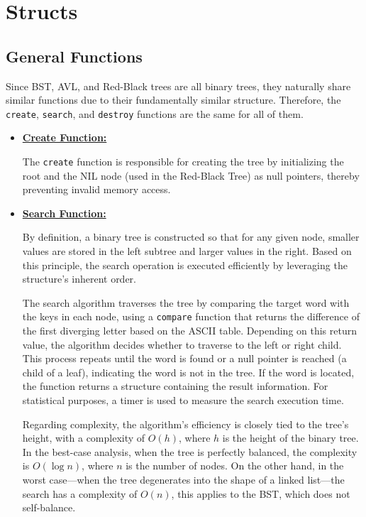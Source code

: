 \section{Structs}







\subsection{General Functions}
Since BST, AVL, and Red-Black trees are all binary trees, they naturally share similar functions due to their fundamentally similar structure. Therefore, the \texttt{create}, \texttt{search}, and \texttt{destroy} functions are the same for all of them.

\begin{itemize}
    \item \underline{\textbf{Create Function:}}
    
    The \texttt{create} function is responsible for creating the tree by initializing the root and the NIL node (used in the Red-Black Tree) as null pointers, thereby preventing invalid memory access.\newline
    
    \item \underline{\textbf{Search Function:}}
    
    By definition, a binary tree is constructed so that for any given node, smaller values are stored in the left subtree and larger values in the right. Based on this principle, the search operation is executed efficiently by leveraging the structure's inherent order.
    
    The search algorithm traverses the tree by comparing the target word with the keys in each node, using a \texttt{compare} function that returns the difference of the first diverging letter based on the ASCII table. Depending on this return value, the algorithm decides whether to traverse to the left or right child. This process repeats until the word is found or a null pointer is reached (a child of a leaf), indicating the word is not in the tree. If the word is located, the function returns a structure containing the result information. For statistical purposes, a timer is used to measure the search execution time.
    
    Regarding complexity, the algorithm's efficiency is closely tied to the tree's height, with a complexity of \(O(h)\), where \(h\) is the height of the binary tree. In the best-case analysis, when the tree is perfectly balanced, the complexity is \(O(\log n)\), where \(n\) is the number of nodes. On the other hand, in the worst case—when the tree degenerates into the shape of a linked list—the search has a complexity of \(O(n)\), this applies to the BST, which does not self-balance.\newline


\end{itemize}
